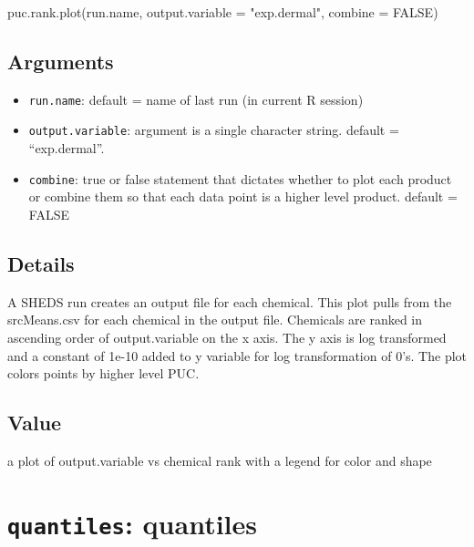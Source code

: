 \documentclass[
]{article}
\newenvironment{Shaded}{\begin{snugshade}}{\end{snugshade}}
\newcommand{\AttributeTok}[1]{\textcolor[rgb]{0.77,0.63,0.00}{#1}}
\newcommand{\ConstantTok}[1]{\textcolor[rgb]{0.00,0.00,0.00}{#1}}
\newcommand{\FunctionTok}[1]{\textcolor[rgb]{0.00,0.00,0.00}{#1}}
\newcommand{\NormalTok}[1]{#1}
\newcommand{\StringTok}[1]{\textcolor[rgb]{0.31,0.60,0.02}{#1}}
\providecommand{\tightlist}{%
  \setlength{\itemsep}{0pt}\setlength{\parskip}{0pt}}
\begin{document}
\begin{Shaded}
\begin{Highlighting}[]
\FunctionTok{puc.rank.plot}\NormalTok{(run.name, }\AttributeTok{output.variable =} \StringTok{"exp.dermal"}\NormalTok{, }\AttributeTok{combine =} \ConstantTok{FALSE}\NormalTok{)}
\end{Highlighting}
\end{Shaded}

\hypertarget{arguments-30}{%
\subsection{Arguments}\label{arguments-30}}

\begin{itemize}
\tightlist
\item
  \texttt{run.name}: default = name of last run (in current R session)
\item
  \texttt{output.variable}: argument is a single character string.
  default = ``exp.dermal''.
\item
  \texttt{combine}: true or false statement that dictates whether to
  plot each product or combine them so that each data point is a higher
  level product. default = FALSE
\end{itemize}

\hypertarget{details-23}{%
\subsection{Details}\label{details-23}}

A SHEDS run creates an output file for each chemical. This plot pulls
from the srcMeans.csv for each chemical in the output file. Chemicals
are ranked in ascending order of output.variable on the x axis. The y
axis is log transformed and a constant of 1e-10 added to y variable for
log transformation of 0's. The plot colors points by higher level PUC.

\hypertarget{value-28}{%
\subsection{Value}\label{value-28}}

a plot of output.variable vs chemical rank with a legend for color and
shape

\hypertarget{quantiles-quantiles}{%
\section{\texorpdfstring{\texttt{quantiles}:
quantiles}{quantiles: quantiles}}\label{quantiles-quantiles}}
\end{document}
